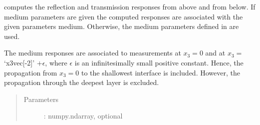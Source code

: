\documentclass[letterpaper,10pt,english]{sphinxmanual}
\begin{document}
\begin{fulllineitems}
\begin{fulllineitems}
%
\begin{sphinxVerbatim}[commandchars=\\\{\}]
\PYG{p}{[}\PYG{p}{]}\PYG{p}{[}\PYG{p}{]}
\end{sphinxVerbatim}

\end{fulllineitems}


\begin{fulllineitems}
\label{\detokenize{Layered_NRM_p_w:Layered_NRM_p_w.Layered_NRM_p_w.RT_response_p_w}}
computes the reflection and transmission responses from above and from below. If medium parameters are given the computed responses are associated with the given parameters medium. Otherwise, the medium parameters defined in  are used.

The medium responses are associated to measurements at \(x_3=0\) and at \(x_3=\) ‘x3vec{[}-2{]}’ \(+\epsilon\), where \(\epsilon\) is an infinitesimally small positive constant. Hence, the propagation from \(x_3=0\) to the shallowest interface is included. However, the propagation through the deepest layer is excluded.
\begin{quote}\begin{description}
\item[{Parameters}] \leavevmode
{} : numpy.ndarray, optional
\begin{quote}


\end{quote}
\end{description}
\end{quote}
\end{fulllineitems}
\end{fulllineitems}
\end{document}

